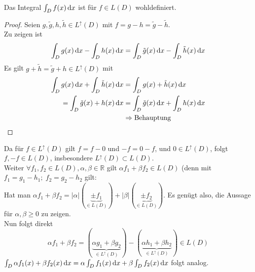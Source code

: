 \begin{proposition}
	Das Integral $\int_{D} f(x) \,\text{d}x$ ist für $f\in L(D)$ wohldefiniert.
\end{proposition}
\begin{proof}
	Seien $g,\tilde{g},h,\tilde{h}\in L^\uparrow(D)$ mit $f=g-h=\tilde{g}-\tilde{h}$.\\
	Zu zeigen ist \[\int_{D} g(x) \,\text{d}x-\int_{D} h(x) \,\text{d}x = \int_{D} \tilde{g}(x) \,\text{d}x-\int_{D} \tilde{h}(x) \,\text{d}x\]
	Es gilt $g+\tilde{h}=\tilde{g}+h\in L^\uparrow(D)$ mit 
	\begin{align*}
		\int_{D} g(x) \,\text{d}x+\int_{D} \tilde{h}(x) \,\text{d}x
		&=\int_{D} g(x)+\tilde{h}(x) \,\text{d}x\\
		=\int_{D} \tilde{g}(x)+h(x) \,\text{d}x
		&=\int_{D} \tilde{g}(x) \,\text{d}x+\int_{D} h(x) \,\text{d}x\\
		&\Rightarrow \text{Behauptung}
	\end{align*}
\end{proof}
Da für $f\in L^\uparrow(D)$ gilt $f=f-0$ und $-f = 0 - f$, und $0\in L^\uparrow(D)$, folgt $f,-f\in L(D)$, insbesondere $L^\uparrow(D)\subset L(D)$.\\
Weiter $\forall f_1,f_2\in L(D), \alpha, \beta\in\mathbb{R}$ gilt $\alpha f_1 + \beta f_2\in L(D)$ (denn mit $f_1=g_1-h_1;\; f_2=g_2-h_2$ gilt:\\
Hat man $\alpha f_1+\beta f_2=|\alpha|(\underbrace{\pm f_1}_{\in L(D)})+|\beta|(\underbrace{\pm f_2}_{\in L(D)})$. Es genügt also, die Aussage für $\alpha, \beta\geq 0$ zu zeigen.\\
Nun folgt direkt 
\[
	\alpha f_1+\beta f_2 = (\underbrace{\alpha g_1 + \beta g_2}_{\in L^\uparrow(D)}) - (\underbrace{\alpha h_1 + \beta h_2}_{\in L^\uparrow(D)})\in L(D)
\]
$\int_{D} \alpha f_1(x)+\beta f_2(x) \,\text{d}x=\alpha\int_{D} f_1(x) \,\text{d}x+\beta\int_{D} f_2(x) \,\text{d}x$ folgt analog.


